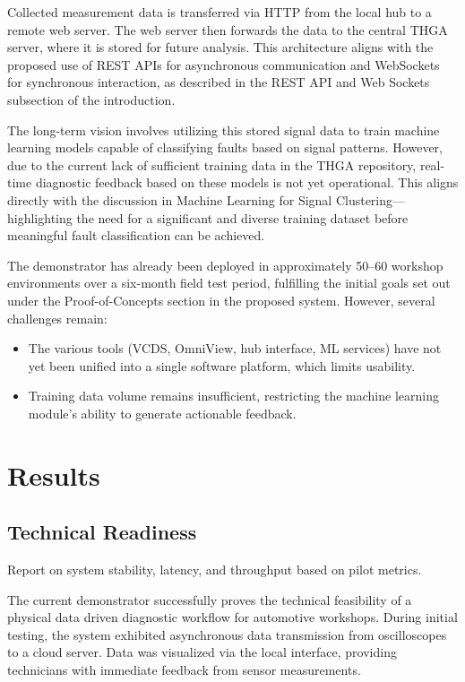 Collected measurement data is transferred via HTTP from the local hub to a remote web server. 
The web server then forwards the data to the central THGA server, where it is stored for future analysis. 
This architecture aligns with the proposed use of REST APIs for asynchronous communication and WebSockets for synchronous interaction, as described in the REST API and Web Sockets subsection of the introduction.

The long-term vision involves utilizing this stored signal data to train machine learning models capable of classifying faults based on signal patterns. 
However, due to the current lack of sufficient training data in the THGA repository, real-time diagnostic feedback based on these models is not yet operational. 
This aligns directly with the discussion in Machine Learning for Signal Clustering—highlighting the need for a significant and diverse training dataset before meaningful fault classification can be achieved.

The demonstrator has already been deployed in approximately 50–60 workshop environments over a six-month field test period, 
fulfilling the initial goals set out under the Proof-of-Concepts section in the proposed system. 
However, several challenges remain:
\begin{itemize}
  \item The various tools (VCDS, OmniView, hub interface, ML services) have not yet been unified into a single software platform, which limits usability.
  \item Training data volume remains insufficient, restricting the machine learning module’s ability to generate actionable feedback.
\end{itemize}



\section{Results}
\subsection{Technical Readiness}
Report on system stability, latency, and throughput based on pilot metrics.

The current demonstrator successfully proves the technical feasibility of a physical data driven diagnostic workflow for automotive workshops. 
During initial testing, the system exhibited asynchronous data transmission from oscilloscopes to a cloud server.
Data was visualized via the local interface, providing technicians with immediate feedback from sensor measurements.

